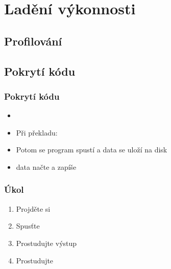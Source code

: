 



\section{Ladění výkonnosti}
\frame{\sectionpage}

\subsection{Profilování}



\subsection{Pokrytí kódu}

\begin{frame}
  \frametitle{Pokrytí kódu}

  \begin{itemize}
    \item {}
    \item Při překladu: 
    \item Potom se program spustí a data se uloží na disk
    \item {} data načte a zapíše 
  \end{itemize}

\end{frame}

\begin{frame}
  \frametitle{Úkol}

  \begin{enumerate}
  \item Projděte si 
  \item Spusťte 
  \item Prostudujte výstup 
  \item Prostudujte 
\end{enumerate}

\end{frame}
